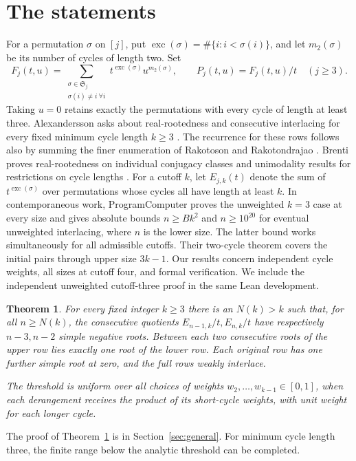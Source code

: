 \documentclass[11pt]{article}
\newtheorem{theorem}{Theorem}
\newcommand{\exc}{\operatorname{exc}}
\begin{document}
\section{The statements}
For a permutation \(\sigma\) on \([j]\), put \(\exc(\sigma)=\#\{i:i<\sigma(i)\}\), and let \(m_2(\sigma)\) be its number of cycles of length two. Set
\[
 F_j(t,u)=\sum_{\substack{\sigma\in\mathfrak S_j\\ \sigma(i)\ne i\ \forall i}}
       t^{\exc(\sigma)}u^{m_2(\sigma)},\qquad
 P_j(t,u)=F_j(t,u)/t\quad(j\ge3).
\]
Taking \(u=0\) retains exactly the permutations with every cycle of length at least three. Alexandersson asks about real-rootedness and consecutive interlacing for every fixed minimum cycle length \(k\ge3\) \cite{alex}. The recurrence for these rows follows also by summing the finer enumeration of Rakotoson and Rakotondrajao \cite[Theorem~30]{rr}. Brenti proves real-rootedness on individual conjugacy classes and unimodality results for restrictions on cycle lengths \cite[Theorems~3.2--3.4]{brenti}.
For a cutoff \(k\), let \(E_{j,k}(t)\) denote the sum of \(t^{\exc(\sigma)}\) over permutations whose cycles all have length at least \(k\).
In contemporaneous work, ProgramComputer \cite{programcomputer} proves the unweighted \(k=3\) case at every size and gives absolute bounds \(n\ge Bk^2\) and \(n\ge10^{20}\) for eventual unweighted interlacing, where \(n\) is the lower size. The latter bound works simultaneously for all admissible cutoffs. Their two-cycle theorem covers the initial pairs through upper size \(3k-1\). Our results concern independent cycle weights, all sizes at cutoff four, and formal verification. We include the independent unweighted cutoff-three proof in the same Lean development.
\begin{theorem}\label{general}
For every fixed integer \(k\ge3\) there is an \(N(k)>k\) such that, for all \(n\ge N(k)\), the consecutive quotients \(E_{n-1,k}/t,E_{n,k}/t\) have respectively \(n-3,n-2\) simple negative roots. Between each two consecutive roots of the upper row lies exactly one root of the lower row. Each original row has one further simple root at zero, and the full rows weakly interlace.

The threshold is uniform over all choices of weights \(w_2,\ldots,w_{k-1}\in[0,1]\), when each derangement receives the product of its short-cycle weights, with unit weight for each longer cycle.
\end{theorem}
The proof of Theorem~\ref{general} is in Section~\ref{sec:general}. For minimum cycle length three, the finite range below the analytic threshold can be completed.
\end{document}
